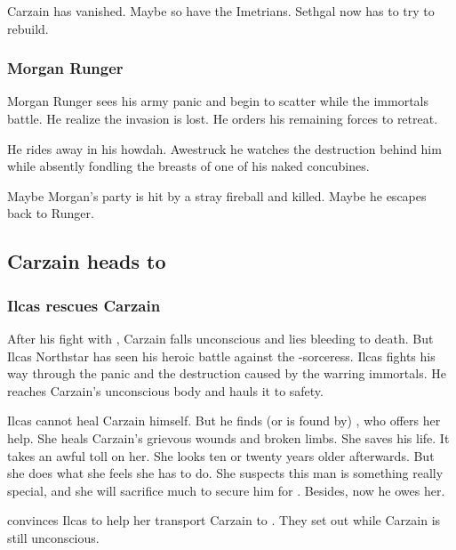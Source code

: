Carzain has vanished.
Maybe so have the Imetrians. 
Sethgal now has to try to rebuild. 





\subsubsection{Morgan Runger}
Morgan Runger sees his army panic and begin to scatter while the immortals battle. 
He realize the invasion is lost. 
He orders his remaining forces to retreat. 

He rides away in his howdah.
Awestruck he watches the destruction behind him while absently fondling the breasts of one of his naked concubines. 

Maybe Morgan's party is hit by a stray fireball and killed. 
Maybe he escapes back to Runger. 










\subsection{Carzain heads to \Redce}





\subsubsection{Ilcas rescues Carzain}
After his fight with \Takestsha, Carzain falls unconscious and lies bleeding to death. 
But Ilcas Northstar has seen his heroic battle against the \dragon-sorceress. 
Ilcas fights his way through the panic and the destruction caused by the warring immortals. 
He reaches Carzain's unconscious body and hauls it to safety. 

Ilcas cannot heal Carzain himself. 
But he finds (or is found by) \Esmerel, who offers her help.
She heals Carzain's grievous wounds and broken limbs. 
She saves his life. 
It takes an awful toll on her.
She looks ten or twenty years older afterwards. 
But she does what she feels she has to do.
She suspects this man is something really special, and she will sacrifice much to secure him for \ClanRedcor.
Besides, now he owes her. 

\Esmerel convinces Ilcas to help her transport Carzain to \Redce. 
They set out while Carzain is still unconscious. 

